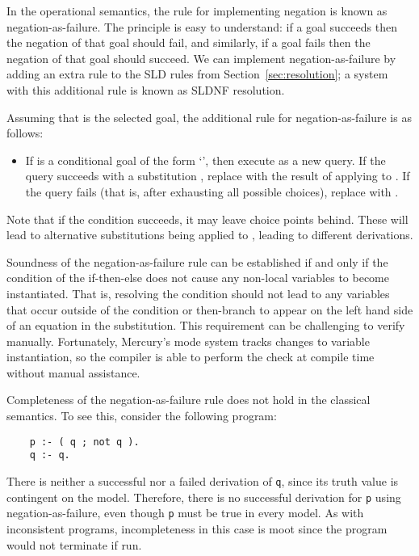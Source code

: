 In the operational semantics,
the rule for implementing negation is known as negation-as-failure.
The principle is easy to understand:
if a goal succeeds then
the negation of that goal should fail,
and similarly, if a goal fails then
the negation of that goal should succeed.
We can implement negation-as-failure
by adding an extra rule to the SLD rules
from Section~\ref{sec:resolution};
a system with this additional rule
is known as SLDNF resolution.

Assuming that  is the selected goal,
the additional rule for negation-as-failure
is as follows:
\begin{itemize}
\item
If  is a conditional goal of the form
`',
then execute  as a new query.
If the query succeeds with a substitution ,
replace  with
the result of applying  to .
If the query fails
(that is, after exhausting all possible choices),
replace  with .
\end{itemize}
Note that if the condition succeeds,
it may leave choice points behind.
These will lead to alternative substitutions
being applied to ,
leading to different derivations.


Soundness\label{gi:soundness2}
of the negation-as-failure rule
can be established if and only if
the condition of the if-then-else
does not cause any non-local variables to become instantiated.
That is, resolving the condition
should not lead to any variables
that occur outside of the condition or then-branch
to appear on the left hand side of an equation in the substitution.
This requirement can be challenging to verify manually.
Fortunately,
Mercury's mode system tracks changes to variable instantiation,
so the compiler is able to perform the check at compile time
without manual assistance.

Completeness\label{gi:completeness2}
of the negation-as-failure rule
does not hold in the classical semantics.
To see this,
consider the following program:
\begin{verbatim}
    p :- ( q ; not q ).
    q :- q.
\end{verbatim}
There is neither a successful nor a failed derivation of \texttt{q},
since its truth value is contingent on the model.
Therefore, there is no successful derivation for \texttt{p}
using negation-as-failure,
even though \texttt{p} must be true in every model.
As with inconsistent programs,
incompleteness in this case is moot
since the program would not terminate if run.


